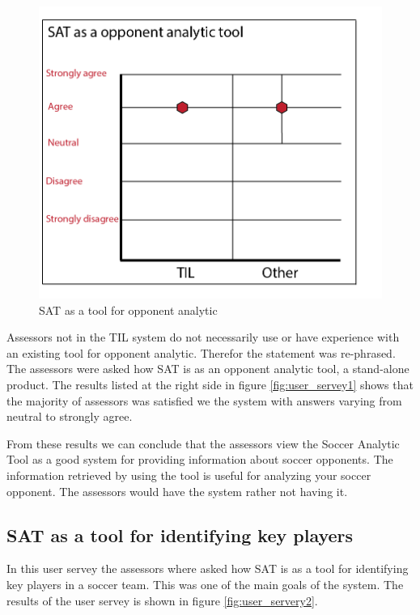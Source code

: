 \begin{figure}[ht!]
\centering
\includegraphics[width=1\textwidth]{images/evaluation/user_servery1}
\caption{SAT as a tool for opponent analytic}
\label{fig:user_servery1}
\end{figure}

Assessors not in the \ac{TIL} system do not necessarily use or have experience with an existing tool for opponent analytic. Therefor the statement was re-phrased. The assessors were asked how SAT is as an opponent analytic tool, a stand-alone product. The results listed at the right side in figure \ref{fig:user_servey1} shows that the majority of assessors was satisfied we the system with answers varying from neutral to strongly agree.

From these results we can conclude that the assessors view the Soccer Analytic Tool as a good system for providing information about soccer opponents. The information retrieved by using the tool is useful for analyzing your soccer opponent. The assessors would have the system rather not having it.

\subsection{SAT as a tool for identifying key players}

In this user servey the assessors where asked how SAT is as a tool for identifying key players in a soccer team. This was one of the main goals of the system. The results of the user servey is shown in figure \ref{fig:user_servery2}.

